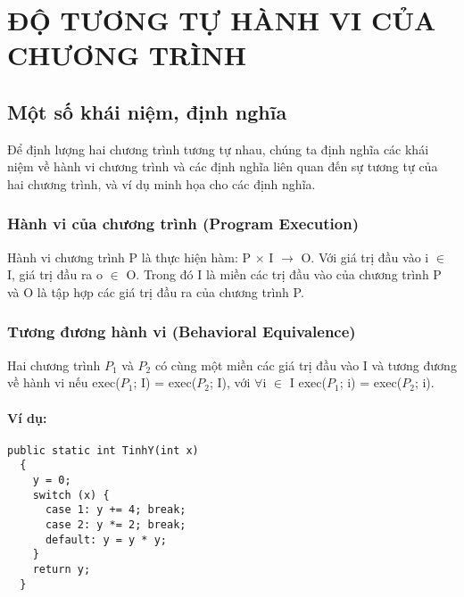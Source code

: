 \chapter{ĐỘ TƯƠNG TỰ HÀNH VI CỦA CHƯƠNG TRÌNH}
	
\section{Một số khái niệm, định nghĩa}
	
Để định lượng hai chương trình tương tự nhau, chúng ta định nghĩa các khái niệm về hành vi chương trình và các định nghĩa liên quan đến sự tương tự của hai chương trình, và ví dụ minh họa cho các định nghĩa. 
	
\subsection{Hành vi của chương trình (Program Execution)}

\begin{definition}\label{def:progexe}
Hành vi chương trình P là thực hiện hàm: P $\times$ I $\rightarrow$ O. Với giá trị đầu vào i $\in$ I, giá trị đầu ra o $\in$ O. Trong đó I là miền các trị đầu vào của chương trình P và O là tập hợp các giá trị đầu ra của chương trình P.  
\end{definition}

	
\subsection{Tương đương hành vi (Behavioral Equivalence)}

\begin{definition}
  Hai chương trình $P_{1}$ và $P_{2}$ có cùng một miền các giá trị đầu
  vào I và tương đương về hành vi nếu exec($P_{1}$; I) = exec($P_{2}$;
  I), với $\forall$i $\in$ I exec($P_{1}$; i) = exec($P_{2}$; i).
\end{definition}
	
\subsubsection{Ví dụ:}


\begin{lstlisting}[language={[Sharp]C}, caption={Tính y, sử dụng hàm switch...case}, label={Script}]
  public static int TinhY(int x)
  {
    y = 0;
    switch (x) {
      case 1: y += 4; break;
      case 2: y *= 2; break;
      default: y = y * y;
    }
    return y;
  }
\end{lstlisting}


